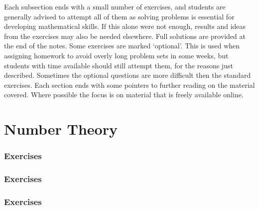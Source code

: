 \documentclass{article}
\theoremstyle{plain}
\numberwithin{theorem}{subsection}
\begin{document}
Each subsection ends with a small number of exercises, and students are generally advised to attempt all of them as solving problems is essential for developing mathematical skills. If this alone were not enough, results and ideas from the exercises may also be needed elsewhere. Full solutions are provided at the end of the notes. Some exercises are marked `optional'. This is used when assigning homework to avoid overly long problem sets in some weeks, but students with time available should still attempt them, for the reasons just described. Sometimes the optional questions are more difficult then the standard exercises. Each section ends with some pointers to further reading on the material covered. Where possible the focus is on material that is freely available online. 


\newpage
\section{Number Theory}{
\let\section\subsection
\let\subsection\subsubsection

\subsubsection*{Exercises}



\subsubsection*{Exercises}



\subsubsection*{Exercises}


}
\end{document}
